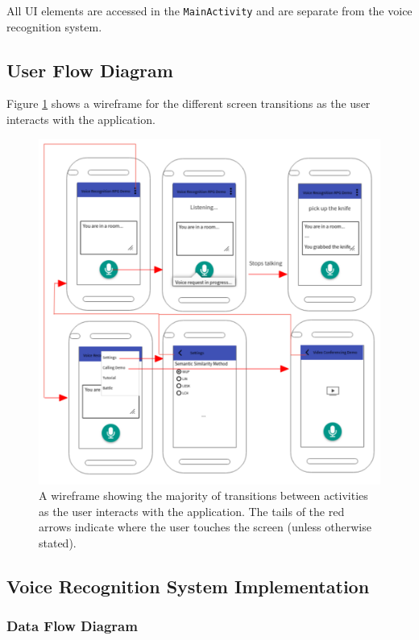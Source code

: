 \documentclass[11pt]{article}
\begin{document}
All UI elements are accessed in the \texttt{MainActivity} and are separate from the voice recognition system.

\subsection{User Flow Diagram}

Figure \ref{fig:wireframe} shows a wireframe for the different screen transitions as the user interacts with the application.

\begin{figure}[H]
\begin{center}
  \includegraphics[width=\linewidth]{wireframe.pdf}
  \caption{A wireframe showing the majority of transitions between activities as the user interacts with the application. The tails of the red arrows indicate where the user touches the screen (unless otherwise stated).}
  \label{fig:wireframe}
  \end{center}
\end{figure}

\subsection{Voice Recognition System Implementation}

\subsubsection{Data Flow Diagram}
\end{document}
